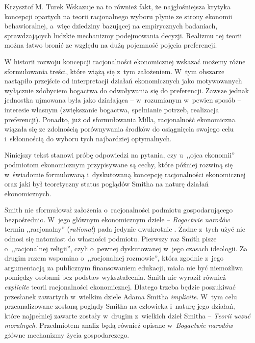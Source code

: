\begin{artplenv}{Krzysztof M. Turek}
Wskazuje na to również fakt, że najgłośniejsza krytyka koncepcji opartych na teorii racjonalnego wyboru płynie ze strony
ekonomii behawioralnej, a~więc dziedziny bazującej na empirycznych badaniach, sprawdzających ludzkie mechanizmy
podejmowania decyzji. Realizmu tej teorii można łatwo bronić ze względu na dużą pojemność pojęcia preferencji.

W historii rozwoju koncepcji racjonalności ekonomicznej wskazać możemy różne sformułowania treści, które wiążą się z~tym
założeniem. W~tym obszarze nastąpiło przejście od interpretacji działań ekonomicznych jako motywowanych wyłącznie
zdobyciem bogactwa do odwoływania się do preferencji. Zawsze jednak jednostka ujmowana była jako
działająca -- w~rozumianym w~pewien sposób -- interesie własnym (zwiększanie bogactwa, spełnianie potrzeb,
realizacja preferencji).
Ponadto, już od sformułowania Milla, racjonalność ekonomiczna wiązała się ze zdolnością porównywania środków do
osiągnięcia swojego celu i~skłonnością do wyboru tych najbardziej optymalnych.

Niniejszy tekst stanowi próbę odpowiedzi na pytania, czy u~,,ojca ekonomii'' podmiotom ekonomicznym przypisywane są cechy,
które później rozwiną się w~świadomie formułowaną i~dyskutowaną koncepcję racjonalności ekonomicznej oraz jaki był
teoretyczny status poglądów Smitha na naturę działań ekonomicznych.

Smith nie sformułował założenia o~racjonalności podmiotu gospodarującego bezpośrednio. W~jego głównym ekonomicznym
dziele -- \textit{Bogactwie narodów} termin ,,racjonalny'' (\textit{rational}) pada
jedynie dwukrotnie
\parencite[s.~603 i~612]{smith_inquiry_2007}.
Żadne z~tych użyć nie odnosi się natomiast do
własności podmiotu. Pierwszy raz Smith pisze o~,,racjonalnej religii'', czyli o~pewnej dyskutowanej w~jego czasach
ideologii. Za drugim razem wspomina o~,,racjonalnej rozmowie'', która zgodnie z~jego argumentacją za publicznym
finansowaniem edukacji, miała nie być niemożliwa pomiędzy osobami bez podstaw wykształcenia. Smith nie wyraził również
\textit{explicite} teorii racjonalności ekonomicznej. Dlatego trzeba będzie poszukiwać przesłanek zawartych w~wielkim
dziele Adama Smitha \textit{implicite}. W~tym celu przeanalizowane zostaną poglądy Smitha na człowieka i~naturę jego
działań, które najpełniej zawarte zostały w~drugim z~wielkich dzieł Smitha -- \textit{Teorii uczuć moralnych}.
Przedmiotem analiz będą również opisane w~\textit{Bogactwie narodów} główne mechanizmy życia gospodarczego.


\end{artplenv}

